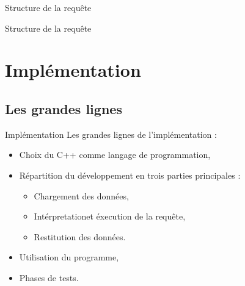 \documentclass[10pt,handout]{beamer}
\newif\ifplacelogo %
\begin{document}
\placelogofalse
\begin{frame}{Structure de la requête}
\end{frame}
\placelogotrue

\begin{frame}{Structure de la requête}

\end{frame}

\section{Implémentation}

\subsection{Les grandes lignes}

\begin{frame}{Implémentation}
  Les grandes lignes de l'implémentation : 
  \begin{itemize}
    \item Choix du C++ comme langage de programmation,
    \item Répartition du développement en trois parties principales :
    \begin{itemize}
      \item Chargement des données,
      \item Intérpretationet éxecution de la requête,
      \item Restitution des données.
    \end{itemize}
    \item Utilisation du programme,
    \item Phases de tests.
  \end{itemize}
\end{frame}
\end{document}
